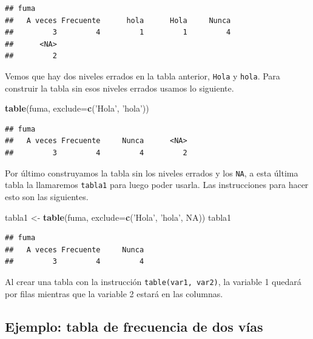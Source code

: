 \documentclass[10pt,]{krantz}
\makeatletter
\newenvironment{Shaded}{\begin{snugshade}}{\end{snugshade}}
\newcommand{\KeywordTok}[1]{\textcolor[rgb]{0.13,0.29,0.53}{\textbf{{#1}}}}
\newcommand{\DataTypeTok}[1]{\textcolor[rgb]{0.13,0.29,0.53}{{#1}}}
\newcommand{\StringTok}[1]{\textcolor[rgb]{0.31,0.60,0.02}{{#1}}}
\newcommand{\OtherTok}[1]{\textcolor[rgb]{0.56,0.35,0.01}{{#1}}}
\newcommand{\NormalTok}[1]{{#1}}
\newenvironment{kframe}{%
\medskip{}
\setlength{\fboxsep}{.8em}
 \def\at@end@of@kframe{}%
 \ifinner\ifhmode%
  \def\at@end@of@kframe{\end{minipage}}%
  \begin{minipage}{\columnwidth}%
 \fi\fi%
 \def\FrameCommand##1{\hskip\@totalleftmargin \hskip-\fboxsep
 \colorbox{shadecolor}{##1}\hskip-\fboxsep
     \hskip-\linewidth \hskip-\@totalleftmargin \hskip\columnwidth}%
 \MakeFramed {\advance\hsize-\width
   \@totalleftmargin\z@ \linewidth\hsize
   \@setminipage}}%
 {\par\unskip\endMakeFramed%
 \at@end@of@kframe}
\renewenvironment{Shaded}{\begin{kframe}}{\end{kframe}}
\let\BeginKnitrBlock\begin \let\EndKnitrBlock\end
\makeatother
\begin{document}
\begin{verbatim}
## fuma
##   A veces Frecuente      hola      Hola     Nunca 
##         3         4         1         1         4 
##      <NA> 
##         2
\end{verbatim}

Vemos que hay dos niveles errados en la tabla anterior, \texttt{Hola} y
\texttt{hola}. Para construir la tabla sin esos niveles errados usamos
lo siguiente.

\begin{Shaded}
\begin{Highlighting}[]
\KeywordTok{table}\NormalTok{(fuma, }\DataTypeTok{exclude=}\KeywordTok{c}\NormalTok{(}\StringTok{'Hola'}\NormalTok{, }\StringTok{'hola'}\NormalTok{))}
\end{Highlighting}
\end{Shaded}

\begin{verbatim}
## fuma
##   A veces Frecuente     Nunca      <NA> 
##         3         4         4         2
\end{verbatim}

Por último construyamos la tabla sin los niveles errados y los
\texttt{NA}, a esta última tabla la llamaremos \texttt{tabla1} para
luego poder usarla. Las instrucciones para hacer esto son las
siguientes.

\begin{Shaded}
\begin{Highlighting}[]
\NormalTok{tabla1 <-}\StringTok{ }\KeywordTok{table}\NormalTok{(fuma, }\DataTypeTok{exclude=}\KeywordTok{c}\NormalTok{(}\StringTok{'Hola'}\NormalTok{, }\StringTok{'hola'}\NormalTok{, }\OtherTok{NA}\NormalTok{))}
\NormalTok{tabla1}
\end{Highlighting}
\end{Shaded}

\begin{verbatim}
## fuma
##   A veces Frecuente     Nunca 
##         3         4         4
\end{verbatim}

\BeginKnitrBlock{rmdnote}
Al crear una tabla con la instrucción \texttt{table(var1,\ var2)}, la
variable 1 quedará por filas mientras que la variable 2 estará en las
columnas.
\EndKnitrBlock{rmdnote}

\subsection*{Ejemplo: tabla de frecuencia de dos
vías}\label{ejemplo-tabla-de-frecuencia-de-dos-vias}
\end{document}
